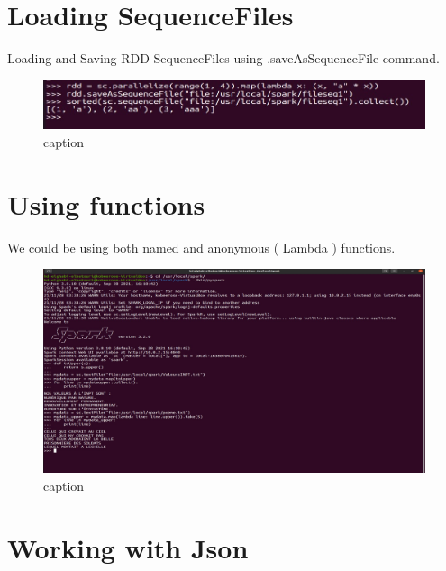 \begin{spacing}{1.2}
\section{Loading SequenceFiles}

\par Loading and Saving RDD SequenceFiles using .saveAsSequenceFile command.
\\
\begin{figure}[!htb] 
\begin{center} 
\includegraphics[width=1\linewidth]{Big_Data/Spark/Manipulating RDDs using pyspark/Loading Sequencefiles.jpg} 
\end{center} 
\caption{caption} 
\end{figure} 
\FloatBarrier

\section{Using functions}

\par We could be using both named and anonymous ( Lambda ) functions.
\\
\begin{figure}[!htb] 
\begin{center} 
\includegraphics[width=1\linewidth]{Big_Data/Spark/Manipulating RDDs using pyspark/Using Functions.jpg} 
\end{center} 
\caption{caption} 
\end{figure} 
\FloatBarrier

\section{Working with Json}



\end{spacing}
